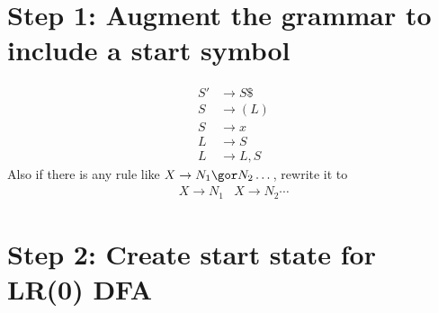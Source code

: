 \section*{Step 1: Augment the grammar to include a start symbol}
\begin{align*}
  S'&\to S\$  \tag{0} \\
  S&\to (L)   \tag{1} \\
  S&\to x     \tag{2} \\
  L&\to S     \tag{3} \\
  L&\to L,S   \tag{4}
\end{align*}
Also if there is any rule like $X\to N_1 \gor N_2 \dots$, rewrite it to
\begin{align*}
  X\to N_1 & X\to N_2 \cdots
\end{align*}
\section*{Step 2: Create start state for LR(0) DFA}
